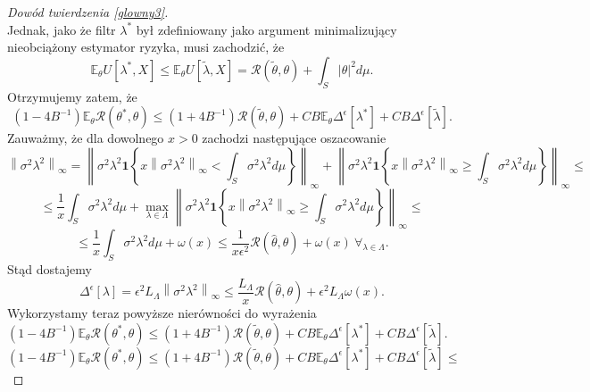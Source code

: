 \documentclass{article}
\newcommand{\norm}[1]{\left\lVert#1\right\rVert}
\begin{document}
\begin{proof}[Dowód twierdzenia \ref{glowny3}]
\begin{displaymath}
\end{displaymath}
Jednak, jako że filtr $\lambda^*$ był zdefiniowany  jako argument minimalizujący nieobciążony estymator ryzyka, musi zachodzić, że
\begin{displaymath}
\mathbb{E}_{\theta}U[\lambda^*,X]\leq \mathbb{E}_{\theta}U[\tilde{\lambda},X]=\mathcal{R}(\tilde{\theta},\theta)+\int_S|\theta |^2d\mu.
\end{displaymath}
Otrzymujemy zatem, że 
\begin{displaymath}
(1-4B^{-1})\mathbb{E}_{\theta}\mathcal{R}(\theta^*,\theta)\leq (1+4B^{-1})\mathcal{R}(\tilde{\theta},\theta)+CB\mathbb{E}_{\theta}\Delta^{\epsilon}[\lambda^*]+CB\Delta^{\epsilon}[\tilde{\lambda}].
\end{displaymath}
Zauważmy, że dla dowolnego $x>0$ zachodzi następujące oszacowanie
\begin{displaymath}
\norm{\sigma^2\lambda^2}_{\infty}=\norm{\sigma^2\lambda^2\pmb{1}\left\{x\norm{\sigma^2\lambda^2}_{\infty}<\int_S\sigma^2\lambda^2 d\mu\right\}}_{\infty}+\norm{\sigma^2\lambda^2\pmb{1}\left\{x\norm{\sigma^2\lambda^2}_{\infty}\geq \int_S\sigma^2\lambda^2 d\mu\right\}}_{\infty}\leq
\end{displaymath}
\begin{displaymath}
\leq \frac{1}{x}\int_S\sigma^2\lambda^2 d\mu+\max_{\lambda\in \Lambda}\norm{\sigma^2\lambda^2\pmb{1}\left\{x\norm{\sigma^2\lambda^2}_{\infty}\geq \int_S\sigma^2\lambda^2 d\mu\right\}}_{\infty}\leq
\end{displaymath}
\begin{displaymath}
\leq \frac{1}{x}\int_S\sigma^2\lambda^2 d\mu+\omega (x)\leq \frac{1}{x\epsilon^2}\mathcal{R}(\hat{\theta},\theta)+\omega (x)\ \forall_{\lambda\in \Lambda}.
\end{displaymath}
Stąd dostajemy 
\begin{displaymath}
\Delta^{\epsilon}[\lambda]=\epsilon^2 L_{\Lambda}\norm{\sigma^2\lambda^2}_{\infty}\leq \frac{L_{\Lambda}}{x}\mathcal{R}(\hat{\theta},\theta)+\epsilon^2L_{\Lambda}\omega (x).
\end{displaymath}
Wykorzystamy teraz powyższe nierówności do wyrażenia $(1-4B^{-1})\mathbb{E}_{\theta}\mathcal{R}(\theta^*,\theta)\leq (1+4B^{-1})\mathcal{R}(\tilde{\theta},\theta)+CB\mathbb{E}_{\theta}\Delta^{\epsilon}[\lambda^*]+CB\Delta^{\epsilon}[\tilde{\lambda}]$.
\begin{displaymath}
(1-4B^{-1})\mathbb{E}_{\theta}\mathcal{R}(\theta^*,\theta)\leq (1+4B^{-1})\mathcal{R}(\tilde{\theta},\theta)+CB\mathbb{E}_{\theta}\Delta^{\epsilon}[\lambda^*]+CB\Delta^{\epsilon}[\tilde{\lambda}]\leq 

\end{displaymath}
\end{proof}
\end{document}
